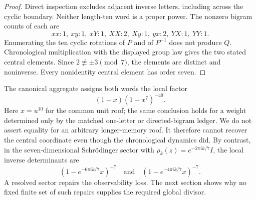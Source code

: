\begin{proof}
Direct inspection excludes adjacent inverse letters, including across the
cyclic boundary. Neither length-ten word is a proper power. The nonzero
bigram counts of each are
\[
xx:1,\ xy:1,\ xY:1,\ XX:2,\ Xy:1,\ yx:2,\ YX:1,\ YY:1.
\]
Enumerating the ten cyclic rotations of \(P\) and of \(P^{-1}\) does not
produce \(Q\). Chronological multiplication with the displayed group law
gives the two stated central elements. Since \(2\not\equiv\pm3\pmod7\), the
elements are distinct and noninverse. Every nonidentity central element has
order seven.
\end{proof}

The canonical aggregate assigns both words the local factor
\[
(1-x)(1-x^7)^{-49}.
\]
Here \(x=u^{10}\) for the common unit roof; the same conclusion holds for a
weight determined only by the matched one-letter or directed-bigram ledger.
We do not assert equality for an arbitrary longer-memory roof.
It therefore cannot recover the central coordinate even though the
chronological dynamics did. By contrast, in the seven-dimensional
Schrödinger sector with
\(\rho_k(z)=e^{-2\pi ik/7}I\), the local inverse determinants are
\[
(1-e^{-6\pi ik/7}x)^{-7}
\quad\text{and}\quad
(1-e^{-4\pi ik/7}x)^{-7}.
\]
A resolved sector repairs the observability loss. The next section shows why
no fixed finite set of such repairs supplies the required global divisor.
